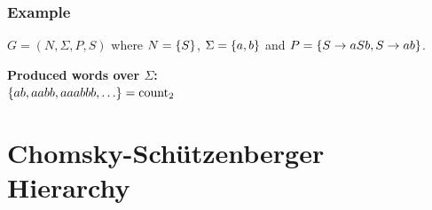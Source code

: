 \documentclass{beamer}
\DeclareMathOperator{\countL}{count}
\begin{document}
	\begin{frame} \frametitle{Example}
		\begin{example}
			$G = (N,\Sigma, P, S)$ where $N = \left\{ S \right\}$, $\Sigma = \left\{ a,b \right\}$ and $P = \left\{ S \to aSb, S \to ab \right\}$.
		\end{example}
	
		\pause
		
			\textbf{Produced words over $\Sigma$:} \\
			$\menge{ab,aabb,aaabbb, \dots} = \countL_2$

	\end{frame}

	

	\section{Chomsky-Schützenberger Hierarchy}
	
\end{document}
